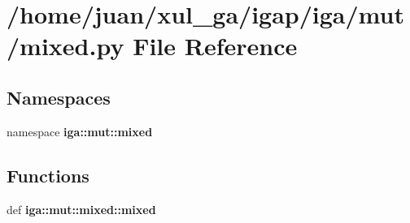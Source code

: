 \section{/home/juan/xul\_\-ga/igap/iga/mut/mixed.py File Reference}
\label{mut_2mixed_8py}
\subsection*{Namespaces}
\begin{CompactItemize}
\item 
namespace {\bf iga::mut::mixed}
\end{CompactItemize}
\subsection*{Functions}
\begin{CompactItemize}
\item 
def {\bf iga::mut::mixed::mixed}
\end{CompactItemize}
